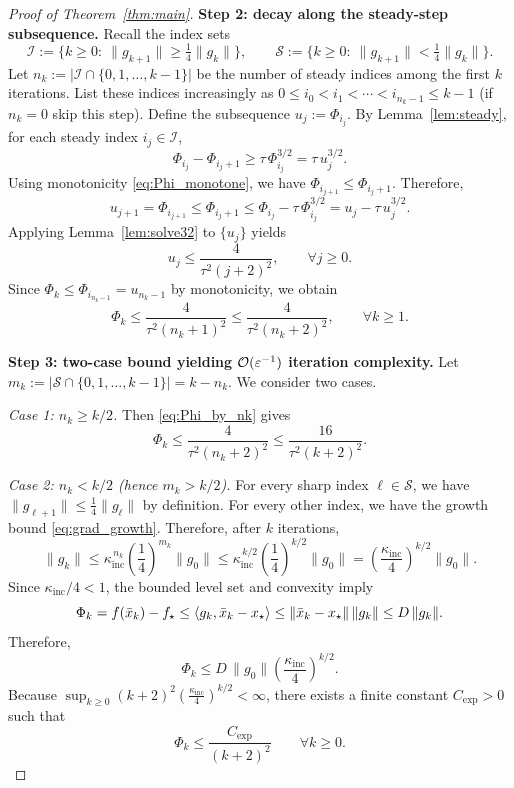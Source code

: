 \documentclass[review,onefignum,onetabnum]{siamart171218}
\begin{document}
\begin{proof}[Proof of Theorem~\ref{thm:main}]
\smallskip
\noindent\textbf{Step 2: decay along the steady-step subsequence.}
Recall the index sets
\[
\mathcal I:=\{k\ge 0:\ \|g_{k+1}\|\ge \tfrac14\|g_k\|\},
\qquad
\mathcal S:=\{k\ge 0:\ \|g_{k+1}\|< \tfrac14\|g_k\|\}.
\]
Let $n_k:=|\mathcal I\cap\{0,1,\dots,k-1\}|$ be the number of steady indices among the first $k$ iterations.
List these indices increasingly as $0\le i_0<i_1<\cdots<i_{n_k-1}\le k-1$ (if $n_k=0$ skip this step).
Define the subsequence $u_j:=\Phi_{i_j}$.
By Lemma~\ref{lem:steady}, for each steady index $i_j\in\mathcal I$,
\[
\Phi_{i_j}-\Phi_{i_j+1}\ge \tau\,\Phi_{i_j}^{3/2}=\tau\,u_j^{3/2}.
\]
Using monotonicity \eqref{eq:Phi_monotone}, we have $\Phi_{i_{j+1}}\le \Phi_{i_j+1}$.
Therefore,
\[
u_{j+1}=\Phi_{i_{j+1}}
\le \Phi_{i_j+1}
\le \Phi_{i_j}-\tau\,\Phi_{i_j}^{3/2}
= u_j-\tau\,u_j^{3/2}.
\]
Applying Lemma~\ref{lem:solve32} to $\{u_j\}$ yields
\begin{equation}\label{eq:u_bound}
u_j\le \frac{4}{\tau^2(j+2)^2},\qquad \forall j\ge 0.
\end{equation}
Since $\Phi_k\le \Phi_{i_{n_k-1}}=u_{n_k-1}$ by monotonicity, we obtain
\begin{equation}\label{eq:Phi_by_nk}
\Phi_k\le \frac{4}{\tau^2(n_k+1)^2}\le \frac{4}{\tau^2(n_k+2)^2},
\qquad \forall k\ge 1.
\end{equation}

\smallskip
\noindent\textbf{Step 3: two-case bound yielding $\mathcal{O}(\varepsilon^{-1})$ iteration complexity.}
Let $m_k:=|\mathcal S\cap\{0,1,\dots,k-1\}|=k-n_k$.
We consider two cases.

\emph{Case 1: $n_k\ge k/2$.}
Then \eqref{eq:Phi_by_nk} gives
\[
\Phi_k\le \frac{4}{\tau^2(n_k+2)^2}\le \frac{16}{\tau^2(k+2)^2}.
\]

\emph{Case 2: $n_k< k/2$ (hence $m_k>k/2$).}
For every sharp index $\ell\in\mathcal S$, we have $\|g_{\ell+1}\|\le \frac14\|g_\ell\|$ by definition.
For every other index, we have the growth bound \eqref{eq:grad_growth}.
Therefore, after $k$ iterations,
\[
\|g_k\|
\le \kappa_{\mathrm{inc}}^{\,n_k}\left(\frac14\right)^{m_k}\|g_0\|
\le \kappa_{\mathrm{inc}}^{\,k/2}\left(\frac14\right)^{k/2}\|g_0\|
=\left(\frac{\kappa_{\mathrm{inc}}}{4}\right)^{k/2}\|g_0\|.
\]
Since $\kappa_{\mathrm{inc}}/4<1$, the bounded level set and convexity imply
\[
\Phi_k=f(\bar x_k)-f_\star
\le \left\langle g_k,\bar x_k-x_\star\right\rangle
\le \|\bar x_k-x_\star\|\,\|g_k\|
\le D\,\|g_k\|.
\]
Therefore,
\[
\Phi_k\le D\,\|g_0\|\left(\frac{\kappa_{\mathrm{inc}}}{4}\right)^{k/2}.
\]
Because $\sup_{k\ge 0}(k+2)^2\left(\frac{\kappa_{\mathrm{inc}}}{4}\right)^{k/2}<\infty$, there exists a finite constant $C_{\exp}>0$ such that
\[
\Phi_k\le \frac{C_{\exp}}{(k+2)^2}\qquad\forall k\ge 0.
\]


\end{proof}
\end{document}
